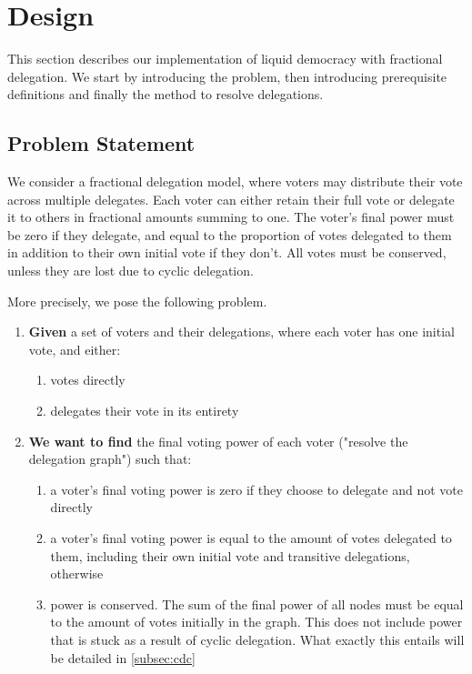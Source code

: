\graphicspath{ {./figures/} }

\chapter{Design}
\label{chap:design}

This section describes our implementation of liquid democracy with fractional delegation. We start by introducing the problem, then introducing prerequisite definitions and finally the method to resolve delegations. 

\section{Problem Statement}

We consider a fractional delegation model, where voters may distribute their vote across multiple  delegates. Each voter can either retain their full vote or delegate it to others in fractional amounts summing to one. The voter's final power must be zero if they delegate, and equal to the proportion of votes delegated to them in addition to their own initial vote if they don't. All votes must be conserved, unless they are lost due to cyclic delegation.

More precisely, we pose the following problem.

\begin{enumerate}
\item \textbf{Given} a set of voters and their delegations, where each voter has one initial vote, and either:
\begin{enumerate}
\item votes directly 
\item delegates their vote in its entirety
\end{enumerate}
\item \textbf{We want to find} the final voting power of each voter ("resolve the delegation graph") such that:
\begin{enumerate}
\item a voter's final voting power is zero if they choose to delegate and not vote directly 
\item a voter's final voting power is equal to the amount of votes delegated to them, including their own initial vote and transitive delegations, otherwise
\item power is conserved. The sum of the final power of all nodes must be equal to the amount of votes initially in the graph. This does not include power that is stuck as a result of cyclic delegation. What exactly this entails will be detailed in \cref{subsec:cdc}
\end{enumerate}
\end{enumerate}

